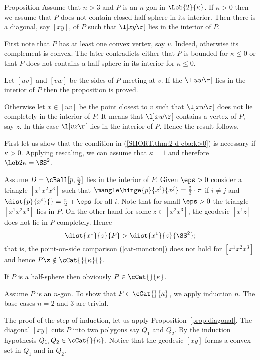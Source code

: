 \begin{thm}{Proposition}\label{prop:diagonal}
Assume that $n>3$ 
and $P$ is an $n$-gon in $\Lob{2}{\kappa}$.
If $\kappa>0$ then we assume that $P$ does not contain closed half-sphere in its interior.
Then there is a  diagonal, say $[xy]$, of $P$ 
such that $\l]xy\r[$ lies in the interior of $P$.
\end{thm}

First note that $P$ has at least one convex vertex, say $v$.
Indeed, otherwise its complement is convex.
The later contradicts either
that $P$ is bounded for $\kappa\le  0$ 
or that $P$ does not contains a half-sphere in its interior for $\kappa\le  0$.

Let $[uv]$ and $[vw]$ be the sides of $P$ meeting at $v$.
If the $\l]uw\r[$ lies in the interior of $P$ 
then the proposition is proved.


Otherwise let $x\in[uv]$ be the point closest to $v$
such that $\l]xw\r[$ does not lie completely in the interior of $P$.
It means that $\l]xw\r[$ contains a vertex of $P$, 
say $z$.
In this case $\l]vz\r[$ lies in the interior of $P$.
Hence the result follows.
\qeds


First let us show that the condition in (\ref{SHORT.thm:2-d-cba:k>0}) is necessary if $\kappa>0$. 
Applying rescaling, we can assume that $\kappa=1$ and therefore $\Lob2\kappa=\SS^2$.

Assume $D=\cBall[p,\tfrac{\pi}2]$ lies in  the interior of $P$.
Given $\eps>0$
consider a triangle $[x^1x^2x^3]$ 
such that $\mangle\hinge{p}{x^i}{x^j}=\tfrac23\cdot\pi$ if $i\ne j$
and 
$\dist{p}{x^i}{}=\tfrac{\pi}2+\eps$ for all $i$.
Note that for small $\eps>0$ the triangle $ [x^1x^2x^3]$ lies in $P$.
On the other hand for some $z\in[x^2x^3]$, the geodesic $[x^1z]$ does not lie in $P$ completely.
Hence 
\[\dist{x^1}{z}{P}>\dist{x^1}{z}{\SS^2};\]
that is, the point-on-side comparison (\ref{cat-monoton}) does not hold for $[x^1x^2x^3]$
and hence $P\z\notin \cCat{}{\kappa}{}$.

If $P$ is a half-sphere then obviously $P\in\cCat{}{\kappa}$.

Assume $P$ is an $n$-gon.
To show that $P\in\cCat{}{\kappa}$,
we apply induction $n$.
The base cases $n=2$ and $3$ are trivial.

The proof of the step of induction,
let us apply Proposition~\ref{prop:diagonal}.
The diagonal $[xy]$ cuts $P$ into two polygons say $Q_1$ and $Q_2$.
By the induction hypothesis $Q_1,Q_2\in\cCat{}{\kappa}$.
Notice that the geodesic $[xy]$ forms a convex set
in $Q_1$ and in $Q_2$.

